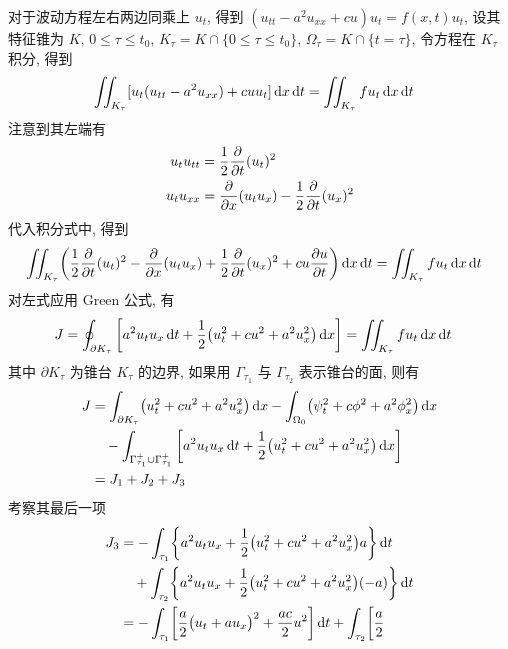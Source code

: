 \begin{solution}
对于波动方程左右两边同乘上 $u_t$, 得到
$(u_{tt} - a^2 u_{xx} + cu) u_t = f(x, t) u_t$, 设其特征锥为 $K$,
$0 \leq \tau \leq t_0$, $K_\tau = K \cap \{0 \leq \tau \leq t_0\}$,
$\Omega_\tau = K \cap \{t = \tau\}$, 令方程在 $K_\tau$ 积分, 得到
\begin{align*}
&\iint_{K_\tau} [ u_t(u_{tt} - a^2 u_{xx}) + c u u_t ] \operatorname{d\!} x \operatorname{d\!} t
    = \iint_{K_\tau} f u_t \operatorname{d\!} x \operatorname{d\!} t
\end{align*}
注意到其左端有
\begin{align*}
    u_t u_{tt} &= \frac12{{\frac{\partial {}}{\partial {t}}}}(u_t)^2 \\
    u_t u_{xx} &= {{\frac{\partial {}}{\partial {x}}}} (u_t u_x) - \frac12{{\frac{\partial {}}{\partial {t}}}}(u_x)^2
\end{align*}
代入积分式中, 得到
\begin{align*}
&\iint_{K_\tau} \biggl(
    \frac12{{\frac{\partial {}}{\partial {t}}}}(u_t)^2 - {{\frac{\partial {}}{\partial {x}}}} (u_t u_x)
    + \frac12{{\frac{\partial {}}{\partial {t}}}}(u_x)^2
    + c u {\frac{\partial {u}}{\partial {t}}} \biggr) \operatorname{d\!} x \operatorname{d\!} t
    = \iint_{K_\tau} f u_t \operatorname{d\!} x \operatorname{d\!} t
\end{align*}
对左式应用 Green 公式, 有
\begin{align*}
J &= \oint_{\partial K_\tau} {\left[ {
    a^2 u_t u_x \operatorname{d\!} t + \frac12 \bigl(u_t^2 + c u^2 + a^2 u_x^2\bigr)\operatorname{d\!} x
} \right]}
= \iint_{K_\tau} f u_t \operatorname{d\!} x \operatorname{d\!} t
\end{align*}
其中 $\partial K_\tau$ 为锥台 $K_\tau$ 的边界, 如果用 $\Gamma_{\tau_1}$ 与
$\Gamma_{\tau_2}$ 表示锥台的面, 则有
\begin{align*}
J &= \int_{\partial K_\tau} \bigl(u_t^2 + c u^2 + a^2 u_x^2\bigr)\operatorname{d\!} x
- \int_{\Omega_0} \bigl( \psi_t^2 + c \phi^2 + a^2 \phi_x^2 \bigr) \operatorname{d\!} x \\
&\quad- \int_{\Gamma_{\tau_1}^+ \cup \Gamma_{\tau_1}^+} {\left[ {
        a^2 u_t u_x \operatorname{d\!} t + \frac12 \bigl(u_t^2 + c u^2 + a^2 u_x^2\bigr)  
    \operatorname{d\!} x } \right]} \\
&= J_1 + J_2 + J_3
\end{align*}
考察其最后一项
\begin{align*}
J_3 &= -\int_{\tau_1} \biggl\{ a^2 u_t u_x
    + \frac12 \bigl( u_t^2 + c u^2 + a^2 u_x^2 \bigr) a \biggr\} \diff t \\
&\quad+ \int_{\tau_2} \biggl\{ a^2 u_t u_x
    + \frac12 \bigl( u_t^2 + c u^2 + a^2 u_x^2 \bigr) (-a) \biggr\} \diff t \\
&= -\int_{\tau_1} \biggl[ \frac{a}{2}
    \bigl( u_t + a u_x \bigr)^2 + \frac{ac}{2}u^2 \biggr] \diff t
    + \int_{\tau_2} \biggl[ \frac{a}{2}

\end{align*}
\end{solution}
